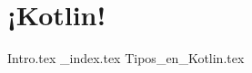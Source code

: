 \chapter{¡Kotlin!}
  {Intro.tex}
  {_index.tex}
  {Tipos_en_Kotlin.tex}
  \printbibliography[keyword=kotlin]
